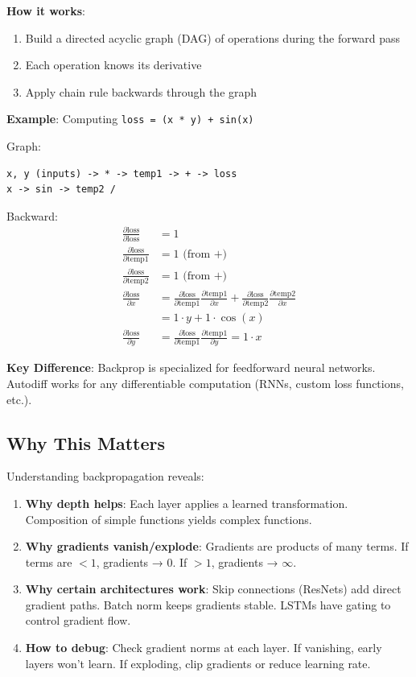 \textbf{How it works}:
\begin{enumerate}
\item Build a directed acyclic graph (DAG) of operations during the forward pass
\item Each operation knows its derivative
\item Apply chain rule backwards through the graph
\end{enumerate}

\textbf{Example}: Computing \texttt{loss = (x * y) + sin(x)}

Graph:
\begin{verbatim}
x, y (inputs) -> * -> temp1 -> + -> loss
x -> sin -> temp2 /
\end{verbatim}

Backward:
\begin{align*}
\frac{\partial \text{loss}}{\partial \text{loss}} &= 1 \\
\frac{\partial \text{loss}}{\partial \text{temp1}} &= 1 \text{ (from +)} \\
\frac{\partial \text{loss}}{\partial \text{temp2}} &= 1 \text{ (from +)} \\
\frac{\partial \text{loss}}{\partial x} &= \frac{\partial \text{loss}}{\partial \text{temp1}} \frac{\partial \text{temp1}}{\partial x} + \frac{\partial \text{loss}}{\partial \text{temp2}} \frac{\partial \text{temp2}}{\partial x} \\
&= 1 \cdot y + 1 \cdot \cos(x) \\
\frac{\partial \text{loss}}{\partial y} &= \frac{\partial \text{loss}}{\partial \text{temp1}} \frac{\partial \text{temp1}}{\partial y} = 1 \cdot x
\end{align*}

\textbf{Key Difference}: Backprop is specialized for feedforward neural networks. Autodiff works for any differentiable computation (RNNs, custom loss functions, etc.).

\subsection{Why This Matters}

Understanding backpropagation reveals:

\begin{enumerate}
\item \textbf{Why depth helps}: Each layer applies a learned transformation. Composition of simple functions yields complex functions.

\item \textbf{Why gradients vanish/explode}: Gradients are products of many terms. If terms are $< 1$, gradients → 0. If $> 1$, gradients → $\infty$.

\item \textbf{Why certain architectures work}: Skip connections (ResNets) add direct gradient paths. Batch norm keeps gradients stable. LSTMs have gating to control gradient flow.

\item \textbf{How to debug}: Check gradient norms at each layer. If vanishing, early layers won't learn. If exploding, clip gradients or reduce learning rate.
\end{enumerate}

